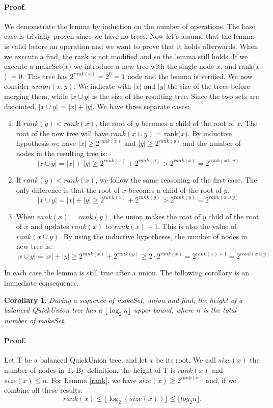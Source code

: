 \documentclass{article}
\newtheorem{corollary}{Corollary}
\begin{document}
\paragraph{\textbf{Proof.}} We demonstrate the lemma by induction on the number of operations. The base case is trivially proven
since we have no trees. Now let's assume that the lemma is valid before an operation and we want to prove that it holds afterwards. When we execute  a find, the rank is not modified and so the lemma still holds.
If we execute a makeSet($x$) we introduce a new tree with the single node $x$, and rank($x$) $ = 0$.
This tree has $2^{rank(x)} = 2^0 = 1$ node  and the lemma is verified. We now consider $union(x, y)$.
We indicate with $|x|$ and $|y|$ the size of the trees before merging them, while $|x \cup y|$ is the size of the resulting tree. Since the two sets are disjointed,
$|x \cup y|$ = $|x| + |y|$.
We have three separate cases:\begin{enumerate}
    \item If $rank(y) < rank(x)$, the root of $y$ becomes a child of the root of $x$. The root of the new tree will have $rank(x \cup y)$ = rank($x$). 
    By inductive hypothesis we have $|x| \geq 2^{rank(x)}\text{ and }|y| \geq 2^{rank(y)}$ and the number
    of nodes in the resulting tree is:
    $$ |x\cup y| = |x| + |y| \geq 2^{rank(x)} + 2^{rank(y)} > 2^{rank(x)} = 2^{rank(x \cup y)} $$
    \item If $rank(y) < rank(x)$, we follow the same reasoning of the first case. The only difference is that
    the root of $x$ becomes a child of the root of $y$.
    $$ |x\cup y| = |x| + |y| \geq 2^{rank(x)} + 2^{rank(y)} > 2^{rank(y)} = 2^{rank(x \cup y)} $$
    \item When $rank(x) = rank(y)$, the union makes the root of $y$ child of the root of $x$ and updates $rank(x)$ to $rank(x) + 1$. This is also the value of $rank(x\cup y)$.
    By using the inductive hypotheses, the number of nodes in new tree is:
    $$  |x\cup y| = |x| + |y| \geq 2^{rank(x)} + 2^{rank(y)} \geq 2\cdot2^{rank(x)} = 2^{rank(x) + 1} = 2^{rank(x \cup y)} $$
\end{enumerate}
In each case the lemma is still true after a union. The following corollary is an immediate consequence.
\begin{corollary}
    During a sequence of makeSet, union and find, the height of a balanced QuickUnion tree has a $\lfloor \log_2 n \rfloor$ upper bound, where $n$
    is the total number of makeSet.
\end{corollary}
\paragraph{Proof.} Let T be a balanced QuickUnion tree, and let $x$ be its root. We call $size(x)$
the number of nodes in T. By definition, the height of T is $rank(x)$ and $size(x) \leq n$. For Lemma
\ref{rank}, we have $size(x) \geq 2^{rank(x)}$ and, if we combine all these results:
$$rank(x) \leq \lfloor \log_2 (size(x))\rfloor \leq \lfloor log_2 n \rfloor.$$
\end{document}
